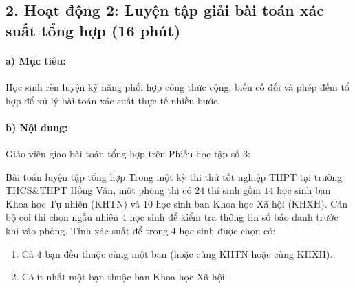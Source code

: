 \documentclass[12pt, a4paper]{article}
\begin{document}
\subsection*{2. Hoạt động 2: Luyện tập giải bài toán xác suất tổng hợp (16 phút)}

\paragraph{a) Mục tiêu:} Học sinh rèn luyện kỹ năng phối hợp công thức cộng, biến cố đối và phép đếm tổ hợp để xử lý bài toán xác suất thực tế nhiều bước.

\paragraph{b) Nội dung:} Giáo viên giao bài toán tổng hợp trên Phiếu học tập số 3:

\begin{pedabox}{Bài toán luyện tập tổng hợp}
Trong một kỳ thi thử tốt nghiệp THPT tại trường THCS\&THPT Hồng Vân, một phòng thi có $24$ thí sinh gồm $14$ học sinh ban Khoa học Tự nhiên (KHTN) và $10$ học sinh ban Khoa học Xã hội (KHXH). Cán bộ coi thi chọn ngẫu nhiên $4$ học sinh để kiểm tra thông tin số báo danh trước khi vào phòng.
Tính xác suất để trong $4$ học sinh được chọn có:
\begin{enumerate}[leftmargin=0.6cm]
    \item[a)] Cả $4$ bạn đều thuộc cùng một ban (hoặc cùng KHTN hoặc cùng KHXH).
    \item[b)] Có ít nhất một bạn thuộc ban Khoa học Xã hội.
\end{enumerate}
\end{pedabox}
\end{document}
